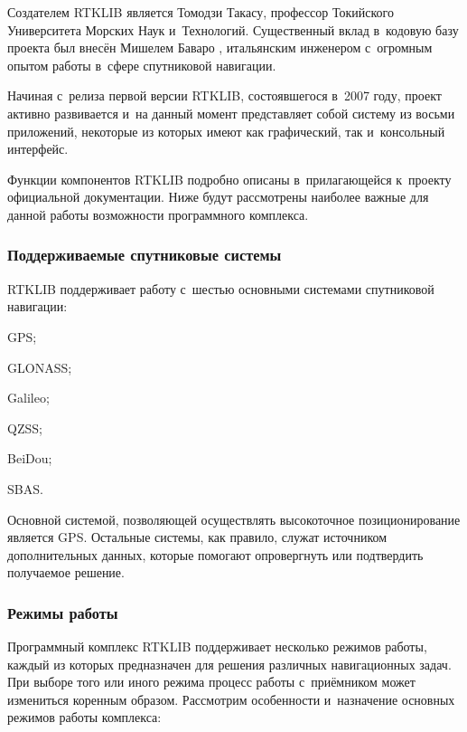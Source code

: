 Создателем RTKLIB является Томодзи Такасу, профессор Токийского Университета Морских Наук и~Технологий. Существенный вклад в~кодовую базу проекта был внесён Мишелем Баваро \cite{RTKLIB,Bavaro}, итальянским инженером с~огромным опытом работы в~сфере спутниковой навигации. \par

Начиная с~релиза первой версии RTKLIB, состоявшегося в~2007 году, проект активно развивается и~на данный момент представляет собой систему из восьми приложений, некоторые из которых имеют как графический, так и~консольный интерфейс. \par

Функции компонентов RTKLIB подробно описаны в~прилагающейся к~проекту официальной документации. Ниже будут рассмотрены наиболее важные для данной работы возможности программного комплекса.

\subsubsection{Поддерживаемые спутниковые системы}

RTKLIB поддерживает работу с~шестью основными системами спутниковой навигации:

\begin{dashitemize}
  \item GPS;
  \item GLONASS;
  \item Galileo;
  \item QZSS;
  \item BeiDou;
  \item SBAS.
\end{dashitemize}

Основной системой, позволяющей осуществлять высокоточное позиционирование является GPS. Остальные системы, как правило, служат источником дополнительных данных, которые помогают опровергнуть или подтвердить получаемое решение.

\subsubsection{Режимы работы}

Программный комплекс RTKLIB поддерживает несколько режимов работы, каждый из которых предназначен для решения различных навигационных задач. При выборе того или иного режима процесс работы с~приёмником может измениться коренным образом. Рассмотрим особенности и~назначение основных режимов работы комплекса:

